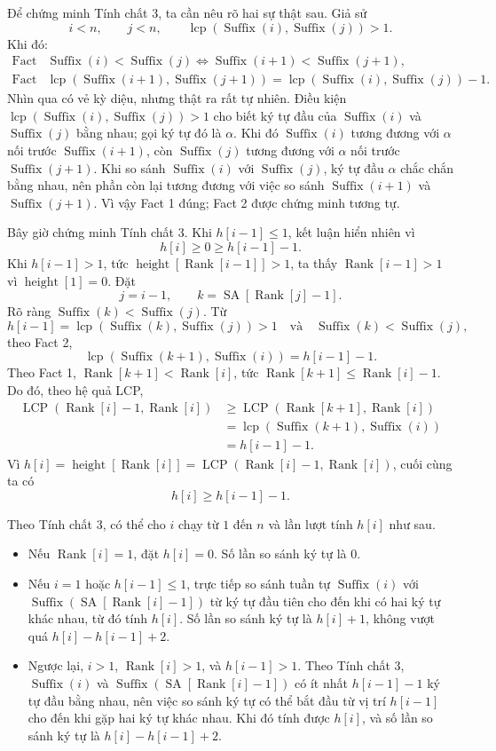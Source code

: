 \documentclass[11pt]{article}
\newcommand{\SA}{\operatorname{SA}}
\newcommand{\Rank}{\operatorname{Rank}}
\newcommand{\Height}{\operatorname{height}}
\newcommand{\Suf}{\operatorname{Suffix}}
\newcommand{\LCP}{\operatorname{LCP}}
\newcommand{\lcp}{\operatorname{lcp}}
\begin{document}
Để chứng minh Tính chất 3, ta cần nêu rõ hai sự thật sau. Giả sử
\[
  i<n,\qquad j<n,\qquad \lcp(\Suf(i),\Suf(j))>1.
\]
Khi đó:
\[
\begin{array}{ll}
\text{Fact 1.} & \Suf(i)<\Suf(j)
  \Longleftrightarrow \Suf(i+1)<\Suf(j+1),\\[0.2em]
\text{Fact 2.} &
  \lcp(\Suf(i+1),\Suf(j+1))
  =\lcp(\Suf(i),\Suf(j))-1.
\end{array}
\]
Nhìn qua có vẻ kỳ diệu, nhưng thật ra rất tự nhiên. Điều kiện
\(\lcp(\Suf(i),\Suf(j))>1\) cho biết ký tự đầu của \(\Suf(i)\) và
\(\Suf(j)\) bằng nhau; gọi ký tự đó là \(\alpha\). Khi đó \(\Suf(i)\) tương
đương với \(\alpha\) nối trước \(\Suf(i+1)\), còn \(\Suf(j)\) tương đương với
\(\alpha\) nối trước \(\Suf(j+1)\). Khi so sánh \(\Suf(i)\) với \(\Suf(j)\),
ký tự đầu \(\alpha\) chắc chắn bằng nhau, nên phần còn lại tương đương với
việc so sánh \(\Suf(i+1)\) và \(\Suf(j+1)\). Vì vậy Fact 1 đúng; Fact 2 được
chứng minh tương tự.

Bây giờ chứng minh Tính chất 3. Khi \(h[i-1]\le 1\), kết luận hiển nhiên vì
\[
  h[i]\ge 0\ge h[i-1]-1.
\]
Khi \(h[i-1]>1\), tức \(\Height[\Rank[i-1]]>1\), ta thấy
\(\Rank[i-1]>1\) vì \(\Height[1]=0\). Đặt
\[
  j=i-1,\qquad k=\SA[\Rank[j]-1].
\]
Rõ ràng \(\Suf(k)<\Suf(j)\). Từ
\[
  h[i-1]=\lcp(\Suf(k),\Suf(j))>1
  \quad\text{và}\quad
  \Suf(k)<\Suf(j),
\]
theo Fact 2,
\[
  \lcp(\Suf(k+1),\Suf(i))=h[i-1]-1.
\]
Theo Fact 1, \(\Rank[k+1]<\Rank[i]\), tức
\(\Rank[k+1]\le \Rank[i]-1\). Do đó, theo hệ quả LCP,
\[
\begin{aligned}
  \LCP(\Rank[i]-1,\Rank[i])
  &\ge \LCP(\Rank[k+1],\Rank[i])\\
  &= \lcp(\Suf(k+1),\Suf(i))\\
  &= h[i-1]-1.
\end{aligned}
\]
Vì \(h[i]=\Height[\Rank[i]]=\LCP(\Rank[i]-1,\Rank[i])\), cuối cùng ta có
\[
  h[i]\ge h[i-1]-1.
\]

Theo Tính chất 3, có thể cho \(i\) chạy từ \(1\) đến \(n\) và lần lượt tính
\(h[i]\) như sau.

\begin{itemize}
  \item Nếu \(\Rank[i]=1\), đặt \(h[i]=0\). Số lần so sánh ký tự là \(0\).
  \item Nếu \(i=1\) hoặc \(h[i-1]\le 1\), trực tiếp so sánh tuần tự
  \(\Suf(i)\) với \(\Suf(\SA[\Rank[i]-1])\) từ ký tự đầu tiên cho đến khi có
  hai ký tự khác nhau, từ đó tính \(h[i]\). Số lần so sánh ký tự là
  \(h[i]+1\), không vượt quá \(h[i]-h[i-1]+2\).
  \item Ngược lại, \(i>1\), \(\Rank[i]>1\), và \(h[i-1]>1\). Theo Tính chất
  3, \(\Suf(i)\) và \(\Suf(\SA[\Rank[i]-1])\) có ít nhất \(h[i-1]-1\) ký tự
  đầu bằng nhau, nên việc so sánh ký tự có thể bắt đầu từ vị trí \(h[i-1]\)
  cho đến khi gặp hai ký tự khác nhau. Khi đó tính được \(h[i]\), và số lần
  so sánh ký tự là \(h[i]-h[i-1]+2\).
\end{itemize}
\end{document}
